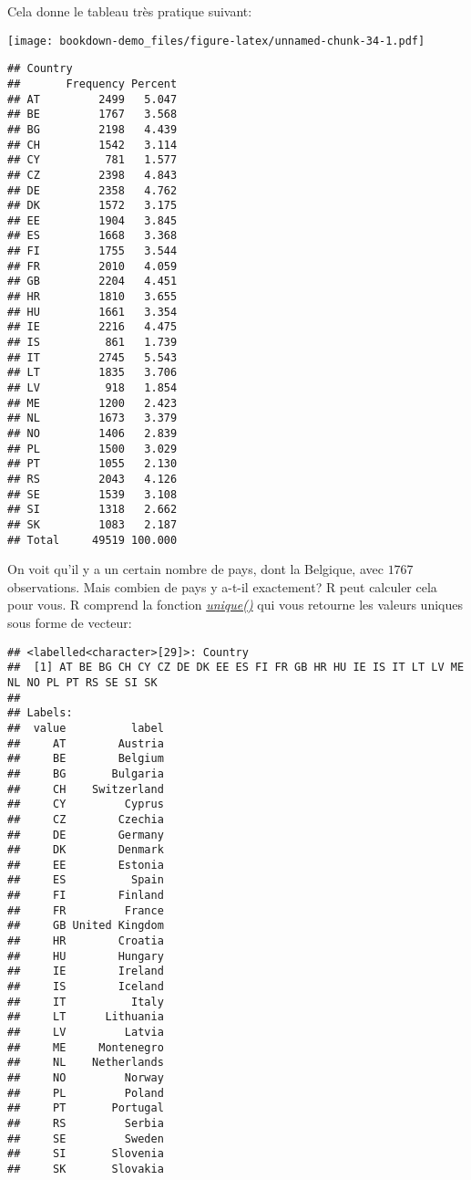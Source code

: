 \documentclass[
]{book}
\newenvironment{Shaded}{\begin{snugshade}}{\end{snugshade}}
\newcommand{\FunctionTok}[1]{\textcolor[rgb]{0.00,0.00,0.00}{#1}}
\newcommand{\NormalTok}[1]{#1}
\newcommand{\SpecialCharTok}[1]{\textcolor[rgb]{0.00,0.00,0.00}{#1}}
\begin{document}
\begin{Shaded}
\end{Shaded}

Cela donne le tableau très pratique suivant:

\texttt{[image: bookdown-demo\_files/figure-latex/unnamed-chunk-34-1.pdf]}

\begin{verbatim}
## Country 
##       Frequency Percent
## AT         2499   5.047
## BE         1767   3.568
## BG         2198   4.439
## CH         1542   3.114
## CY          781   1.577
## CZ         2398   4.843
## DE         2358   4.762
## DK         1572   3.175
## EE         1904   3.845
## ES         1668   3.368
## FI         1755   3.544
## FR         2010   4.059
## GB         2204   4.451
## HR         1810   3.655
## HU         1661   3.354
## IE         2216   4.475
## IS          861   1.739
## IT         2745   5.543
## LT         1835   3.706
## LV          918   1.854
## ME         1200   2.423
## NL         1673   3.379
## NO         1406   2.839
## PL         1500   3.029
## PT         1055   2.130
## RS         2043   4.126
## SE         1539   3.108
## SI         1318   2.662
## SK         1083   2.187
## Total     49519 100.000
\end{verbatim}

On voit qu'il y a un certain nombre de pays, dont la Belgique, avec \(1767\) observations. Mais combien de pays y a-t-il exactement? R peut calculer cela pour vous. R comprend la fonction \href{https://www.rdocumentation.org/packages/base/versions/3.6.2/topics/unique}{\emph{unique()}} qui vous retourne les valeurs uniques sous forme de vecteur:

\begin{Shaded}
\end{Shaded}

\begin{verbatim}
## <labelled<character>[29]>: Country
##  [1] AT BE BG CH CY CZ DE DK EE ES FI FR GB HR HU IE IS IT LT LV ME NL NO PL PT RS SE SI SK
## 
## Labels:
##  value          label
##     AT        Austria
##     BE        Belgium
##     BG       Bulgaria
##     CH    Switzerland
##     CY         Cyprus
##     CZ        Czechia
##     DE        Germany
##     DK        Denmark
##     EE        Estonia
##     ES          Spain
##     FI        Finland
##     FR         France
##     GB United Kingdom
##     HR        Croatia
##     HU        Hungary
##     IE        Ireland
##     IS        Iceland
##     IT          Italy
##     LT      Lithuania
##     LV         Latvia
##     ME     Montenegro
##     NL    Netherlands
##     NO         Norway
##     PL         Poland
##     PT       Portugal
##     RS         Serbia
##     SE         Sweden
##     SI       Slovenia
##     SK       Slovakia
\end{verbatim}
\end{document}

